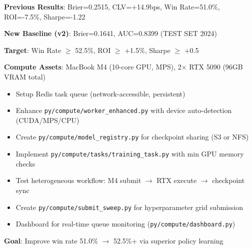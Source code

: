 \textbf{Previous Results}: Brier=0.2515, CLV=+14.9bps, Win Rate=51.0\%, ROI=-7.5\%, Sharpe=-1.22

\textbf{New Baseline (v2)}: Brier=0.1641, AUC=0.8399 (TEST SET 2024)

\textbf{Target}: Win Rate $\ge$ 52.5\%, ROI $\ge$ +1.5\%, Sharpe $\ge$ +0.5

\textbf{Compute Assets}: MacBook M4 (10-core GPU, MPS), 2$\times$ RTX 5090 (96GB VRAM total)

\begin{itemize}
  \item {} Setup Redis task queue (network-accessible, persistent)
  \item {} Enhance \texttt{py/compute/worker\_enhanced.py} with device auto-detection (CUDA/MPS/CPU)
  \item {} Create \texttt{py/compute/model\_registry.py} for checkpoint sharing (S3 or NFS)
  \item {} Implement \texttt{py/compute/tasks/training\_task.py} with min GPU memory checks
  \item {} Test heterogeneous workflow: M4 submit $\to$ RTX execute $\to$ checkpoint sync
  \item {} Create \texttt{py/compute/submit\_sweep.py} for hyperparameter grid submission
  \item {} Dashboard for real-time queue monitoring (\texttt{py/compute/dashboard.py})
\end{itemize}

\textbf{Goal}: Improve win rate 51.0\% $\to$ 52.5\%+ via superior policy learning

